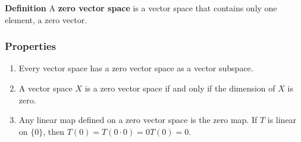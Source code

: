 \documentclass[12pt]{article}
\begin{document}
{\bf Definition}
A {\bf zero vector space} is a vector space that contains only one element, a zero vector. 

\subsubsection{Properties}
\begin{enumerate}
\item Every vector space has a zero vector space as  a vector subspace.
\item A vector space $X$ is a zero vector space if and only if the dimension of $X$ is
zero.
\item Any linear map defined on a zero vector space is the zero map. 
If $T$ is linear on $\{0\}$, then $T(0)=T(0\cdot 0) = 0T(0)=0$. 
\end{enumerate}
\end{document}
